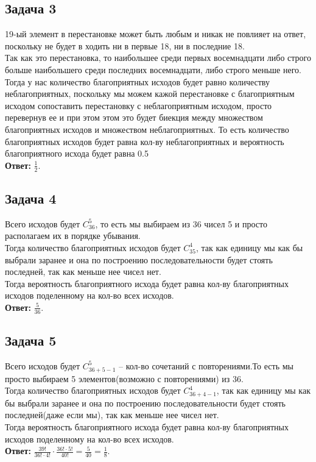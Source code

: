 	\subsection{Задача 3}
	 19-ый элемент в перестановке может быть любым и никак не повлияет на ответ, поскольку не будет в ходить ни в первые 18, ни в последние 18. \\
	 Так как это перестановка, то наибольшее среди первых восемнадцати либо строго больше наибольшего среди последних восемнадцати, либо строго меньше него. Тогда у нас количество благоприятных исходов будет равно количеству неблагоприятных, поскольку мы можем кажой перестановке с благоприятным исходом сопоставить перестановку с неблагоприятным исходом, просто перевернув ее и при этом этом это будет биекция между множеством благоприятных исходов и множеством неблагоприятных. То есть количество благоприятных исходов будет равна кол-ву неблагоприятных и вероятность благоприятного исхода будет равна 0.5 \\
	 \textbf{Ответ:} $\frac{1}{2}$.
	
	\subsection{Задача 4}
	Всего исходов будет $C_{36}^{5}$, то есть мы выбираем из 36 чисел 5 и просто располагаем их в порядке убывания. \\
	Тогда количество благоприятных исходов будет $C_{35}^{4}$, так как единицу мы как бы выбрали заранее и она по построению последовательности будет стоять последней, так как меньше нее чисел нет.\\
	Тогда вероятность благоприятного исхода будет равна кол-ву благоприятных исходов поделенному на кол-во всех исходов.\\
	\textbf{Ответ:} $\frac{5}{36}$.
	  
	\subsection{Задача 5}
	Всего исходов будет $C_{36 + 5 - 1}^{5}$ -- кол-во сочетаний с повторениями.То есть мы просто выбираем 5 элементов(возможно с повторениями) из 36. \\ 
	Тогда количество благоприятных исходов будет $C_{36 + 4 -1}^{4}$, так как единицу мы как бы выбрали заранее и она по построению последовательности будет стоять последней(даже если мы), так как меньше нее чисел нет.\\
	Тогда вероятность благоприятного исхода будет равна кол-ву благоприятных исходов поделенному на кол-во всех исходов.\\
	\textbf{Ответ:} $\frac{39!}{36! \cdot 4!} \cdot \frac{36! \cdot 5!}{40!} = \frac{5}{40} = \frac{1}{8}$.
	
